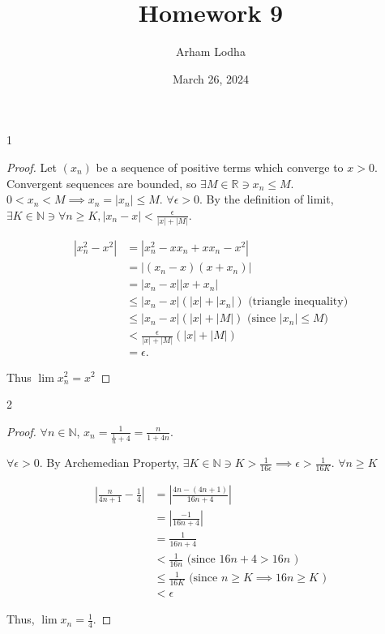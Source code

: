 \documentclass{article}
\newcommand{\R}{\mathbb{R}}
\newcommand{\N}{\mathbb{N}}
\newcommand{\abs}[1]{\left\lvert #1\right\rvert}
\begin{document}
\title{Homework 9}
\author{Arham Lodha}%
\date{March 26, 2024}%
\maketitle

\begin{PROB}{1}\label{Problem 1.}
\end{PROB}
\begin{proof}
    Let $(x_n)$ be a sequence of positive terms which converge to $x > 0$. Convergent sequences are bounded, so $\exists M \in \R \ni x_n \leq M$. $0 < x_n < M \implies x_n = \abs{x_n} \leq M$. $\forall \epsilon > 0$. By the definition of limit, $\exists K \in \N \ni \forall n \geq K, \abs{x_n - x} < \frac{\epsilon}{\abs{x} + \abs{M}}$.     
    
    \begin{align*}
        \abs{x_n^2 - x^2} &= \abs{x_n^2 - x x_n + x x_n - x^2} \\
        &= \abs{(x_n - x)(x + x_n)} \\
        &= \abs{x_n - x}\abs{x + x_n} \\
        &\leq \abs{x_n - x}(\abs{x} + \abs{x_n}) \text{ (triangle inequality)} \\
        &\leq \abs{x_n - x}(\abs{x} + \abs{M}) \text{ (since $\abs{x_n} \leq M$)} \\
        &< \frac{\epsilon}{\abs{x} + \abs{M}}(\abs{x} + \abs{M}) \\
        &= \epsilon.
    \end{align*}
    
    Thus $\lim x_n^2 = x^2$ 
\end{proof}

\bigskip

\begin{PROB}{2}\label{Problem 2.}
\end{PROB}
\begin{proof}
    $\forall n \in \N$, $x_n = \frac{1}{\frac{1}{n} + 4} = \frac{n}{1 + 4n}$.
    
    $\forall \epsilon > 0$. By Archemedian Property, $\exists K \in \N \ni K > \frac{1}{16\epsilon} \implies \epsilon > \frac{1}{16K}$. $\forall n \geq K$   
    
    
    \begin{align*}
        \abs{\frac{n}{4n + 1} - \frac{1}{4}} &= \abs{\frac{4n - (4n + 1)}{16n + 4}} \\
        &= \abs{\frac{-1}{16n + 4}} \\
        &= \frac{1}{16n + 4} \\
        &< \frac{1}{16n} \text{ (since $16n + 4 > 16n$ )}\\
        &\leq \frac{1}{16K} \text{ (since $n \geq K \implies 16n \geq K$ )}\\
        &< \epsilon
    \end{align*}

    Thus, $\lim x_n = \frac{1}{4}$. 
\end{proof}
\end{document}
